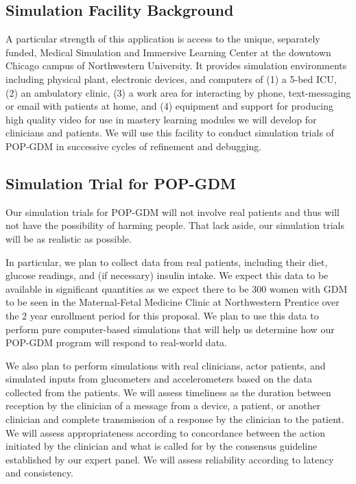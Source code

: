 \subsection{Simulation Facility Background}

A particular strength of this application is access to the unique,
separately funded, Medical Simulation and Immersive Learning Center
at the downtown Chicago campus of
Northwestern University. It provides simulation environments including
physical plant, electronic devices, and computers of (1) a 5-bed ICU,
(2) an ambulatory clinic, (3) a work area for interacting by phone,
text-messaging or email with patients at home, and (4) equipment and
support for producing high quality video for use in mastery learning
modules we will develop for clinicians and patients. We will use this
facility to conduct simulation trials of POP-GDM in successive cycles
of refinement and debugging. 

\subsection{Simulation Trial for POP-GDM}

Our simulation trials for POP-GDM will not involve real patients and
thus will not have the possibility of harming people.  That lack
aside, our simulation trials will be as realistic as possible. 

In particular, we plan to collect data from real patients, including
their diet, glucose readings, and (if necessary) insulin intake. 
%
We expect this data to be available in significant quantities as we
expect there to be 300 women with GDM to be seen in the Maternal-Fetal
Medicine Clinic at Northwestern Prentice over the 2 year enrollment
period for this proposal. 
%
We plan to use this data to perform pure computer-based simulations
that will help us determine how our POP-GDM program will respond to
real-world data.

We also plan to perform simulations with real clinicians, actor
patients, and simulated inputs from glucometers and accelerometers
based on the data collected from the patients.
%
We will assess timeliness as the duration between reception by the
clinician of a message from a device, a patient, or another clinician
and complete transmission of a response by the clinician to the
patient.
%
We will assess appropriateness according to concordance
between the action initiated by the clinician and what is called for
by the consensus guideline established by our expert panel. 
%
We will assess reliability according to latency and consistency. 

